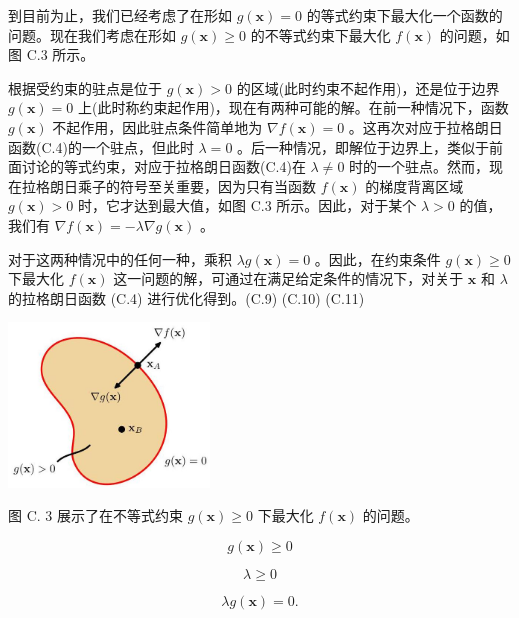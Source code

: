 \documentclass[10pt]{article}
\begin{document}
到目前为止，我们已经考虑了在形如 \(g\left( \mathbf{x}\right)  = 0\) 的等式约束下最大化一个函数的问题。现在我们考虑在形如 \(g\left( \mathbf{x}\right)  \geq  0\) 的不等式约束下最大化 \(f\left( \mathbf{x}\right)\) 的问题，如图 C.3 所示。

根据受约束的驻点是位于 \(g\left( \mathbf{x}\right)  > 0\) 的区域(此时约束不起作用)，还是位于边界 \(g\left( \mathbf{x}\right)  = 0\) 上(此时称约束起作用)，现在有两种可能的解。在前一种情况下，函数 \(g\left( \mathbf{x}\right)\) 不起作用，因此驻点条件简单地为 \(\nabla f\left( \mathbf{x}\right)  = 0\) 。这再次对应于拉格朗日函数(C.4)的一个驻点，但此时 \(\lambda  = 0\) 。后一种情况，即解位于边界上，类似于前面讨论的等式约束，对应于拉格朗日函数(C.4)在 \(\lambda  \neq  0\) 时的一个驻点。然而，现在拉格朗日乘子的符号至关重要，因为只有当函数 \(f\left( \mathbf{x}\right)\) 的梯度背离区域 \(g\left( \mathbf{x}\right)  > 0\) 时，它才达到最大值，如图 C.3 所示。因此，对于某个 \(\lambda  > 0\) 的值，我们有 \(\nabla f\left( \mathbf{x}\right)  =  - \lambda \nabla g\left( \mathbf{x}\right)\) 。

对于这两种情况中的任何一种，乘积 \({\lambda g}\left( \mathbf{x}\right)  = 0\) 。因此，在约束条件 \(g\left( \mathbf{x}\right)  \geq  0\) 下最大化 \(f\left( \mathbf{x}\right)\) 这一问题的解，可通过在满足给定条件的情况下，对关于 \(\mathbf{x}\) 和 \(\lambda\) 的拉格朗日函数 (C.4) 进行优化得到。(C.9) (C.10) (C.11)

\begin{center}
\includegraphics[max width=0.4\textwidth]{images/0194e279-9b28-703a-88f4-c3ac21e2010d_642_1006_1541_542_445_0.jpg}
\end{center}
\hspace*{3em} 

图 C. 3 展示了在不等式约束 \(g\left( \mathbf{x}\right)  \geq  0\) 下最大化 \(f\left( \mathbf{x}\right)\) 的问题。

\[
g\left( \mathbf{x}\right)  \geq  0
\]

\[
\lambda  \geq  0
\]

\[
{\lambda g}\left( \mathbf{x}\right)  = 0.
\]
\end{document}
